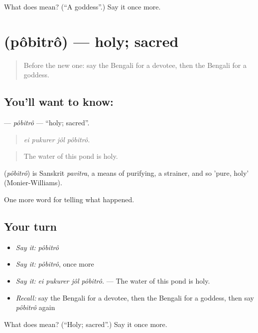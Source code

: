 \begin{tcolorbox}[breakable,colback=teal!4,colframe=teal!35!black,title={Before you move on}]
What does  mean? (\textquotedblleft{}A goddess\textquotedblright{}.) Say it once more.
\end{tcolorbox}
\section[\texorpdfstring{\bn{পবিত্র} (pôbitrô)}{পবিত্র (pôbitrô)}]{ (pôbitrô) — holy; sacred}

\label{lesson:BN-C310-pobitro}



\begin{quote}
Before the new one: say the Bengali for a devotee, then the Bengali for a goddess.
\end{quote}

\subsection*{You'll want to know: }
\textbf{} — \emph{pôbitrô} — \textquotedblleft{}holy; sacred\textquotedblright{}.

\begin{quote}
   
\end{quote}

\begin{quote}
\emph{ei pukurer jôl pôbitrô.}
\end{quote}

\begin{quote}
The water of this pond is holy.
\end{quote}

\begin{cousinweb}
\textbf{} (\emph{pôbitrô}) is Sanskrit \emph{pavitra}, a means of purifying, a strainer, and so 'pure, holy' (Monier-Williams).
\end{cousinweb}

\begin{grammarlens}[title={What you've built}]
One more word for telling what happened.
\end{grammarlens}

\subsection*{Your turn}
\begin{itemize}
\raggedright
  \item \emph{Say it:} \emph{pôbitrô}
  \item \emph{Say it:} \emph{pôbitrô}, once more
  \item \emph{Say it:} \emph{ei pukurer jôl pôbitrô.} — The water of this pond is holy.
  \item \emph{Recall:} say the Bengali for a devotee, then the Bengali for a goddess, then say \emph{pôbitrô} again
\end{itemize}

\begin{tcolorbox}[breakable,colback=teal!4,colframe=teal!35!black,title={Before you move on}]
What does  mean? (\textquotedblleft{}Holy; sacred\textquotedblright{}.) Say it once more.
\end{tcolorbox}
